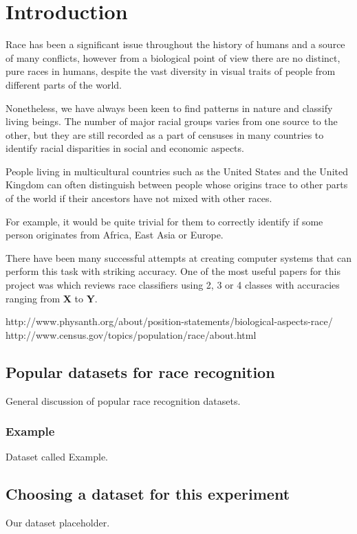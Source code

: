 \chapter{Introduction}
\label{introduction}
Race has been a significant issue throughout the history of humans 
and a source of many conflicts, however from a biological point of view
there are no distinct, pure races in humans, despite the vast diversity 
in visual traits of people from different parts of the world.

Nonetheless, we have always been keen to find patterns in nature and 
classify living beings. The number of major racial groups varies from 
one source to the other, but they are still recorded as a part of censuses 
in many countries to identify racial disparities in social and economic aspects.

People living in multicultural countries such as the United States and the 
United Kingdom can often distinguish between people whose origins trace to other
parts of the world if their ancestors have not mixed with other races.

For example, it would be quite trivial for them to correctly identify if some person
originates from Africa, East Asia or Europe.

There have been many successful attempts at creating computer systems that can perform
this task with striking accuracy. One of the most useful papers for this project was
\citep{muhammadg} which reviews race classifiers using 2, 3 or 4 classes with 
accuracies ranging from \textbf{X} to \textbf{Y}.


http://www.physanth.org/about/position-statements/biological-aspects-race/
http://www.census.gov/topics/population/race/about.html



\section{Popular datasets for race recognition}
\label{introduction:datasets}
General discussion of popular race recognition datasets.
\subsection{Example}
\label{introduction:datasets:example}
Dataset called Example.

\section{Choosing a dataset for this experiment}
\label{introduction:ourdataset} 
Our dataset placeholder.

